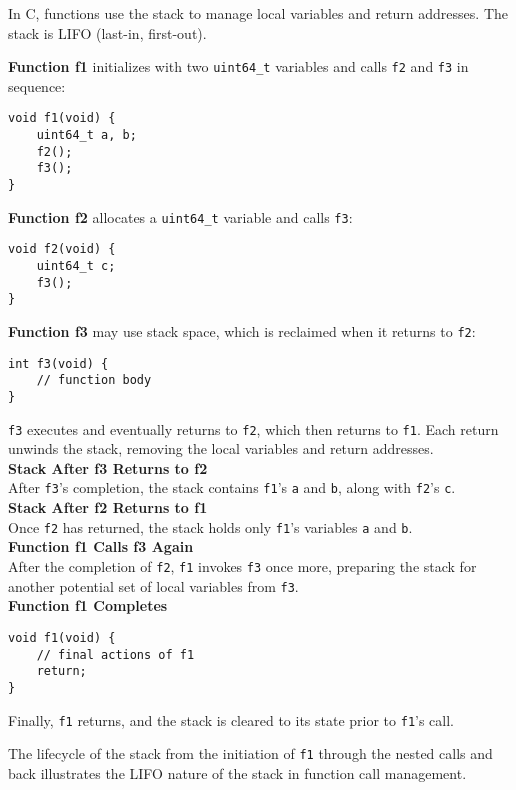 \documentclass[12pt]{article}
\begin{document}
In C, functions use the stack to manage local variables and return addresses. The stack is LIFO (last-in, first-out). 

\textbf{Function f1} initializes with two \texttt{uint64\_t} variables and calls \texttt{f2} and \texttt{f3} in sequence:
\begin{verbatim}
void f1(void) {
    uint64_t a, b;
    f2();
    f3();
}
\end{verbatim}

\textbf{Function f2} allocates a \texttt{uint64\_t} variable and calls \texttt{f3}:
\begin{verbatim}
void f2(void) {
    uint64_t c;
    f3();
}
\end{verbatim}

\textbf{Function f3} may use stack space, which is reclaimed when it returns to \texttt{f2}:
\begin{verbatim}
int f3(void) {
    // function body
}
\end{verbatim}

\texttt{f3} executes and eventually returns to \texttt{f2}, which then returns to \texttt{f1}. Each return unwinds the stack, removing the local variables and return addresses.\\

\textbf{Stack After f3 Returns to f2}\\
After \texttt{f3}'s completion, the stack contains \texttt{f1}'s \texttt{a} and \texttt{b}, along with \texttt{f2}'s \texttt{c}.\\

\textbf{Stack After f2 Returns to f1}\\
Once \texttt{f2} has returned, the stack holds only \texttt{f1}'s variables \texttt{a} and \texttt{b}.\\

\textbf{Function f1 Calls f3 Again}\\
After the completion of \texttt{f2}, \texttt{f1} invokes \texttt{f3} once more, preparing the stack for another potential set of local variables from \texttt{f3}.\\

\textbf{Function f1 Completes}
\begin{verbatim}
void f1(void) {
    // final actions of f1
    return;
}
\end{verbatim}
Finally, \texttt{f1} returns, and the stack is cleared to its state prior to \texttt{f1}'s call.

The lifecycle of the stack from the initiation of \texttt{f1} through the nested calls and back illustrates the LIFO nature of the stack in function call management.
\end{document}
